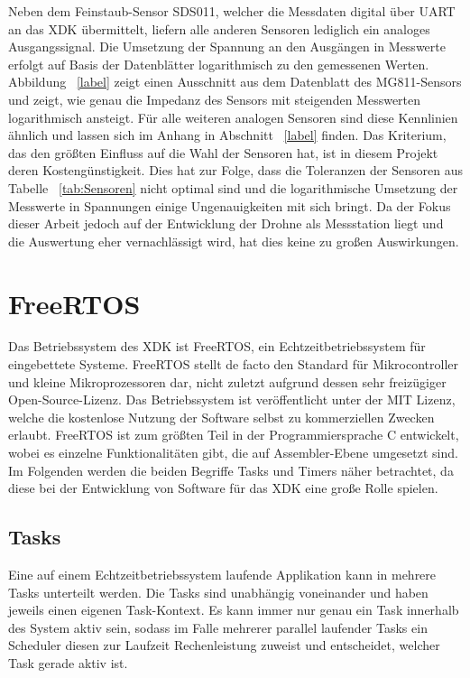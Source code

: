 Neben dem Feinstaub-Sensor SDS011, welcher die Messdaten digital über \acs{UART} an das \acs{XDK} übermittelt, liefern alle anderen Sensoren lediglich ein analoges Ausgangssignal. Die Umsetzung der Spannung an den Ausgängen in Messwerte erfolgt auf Basis der Datenblätter logarithmisch zu den gemessenen Werten. \newline
Abbildung ~\ref{label} zeigt einen Ausschnitt aus dem Datenblatt des MG811-Sensors und zeigt, wie genau die Impedanz des Sensors mit steigenden Messwerten logarithmisch ansteigt. Für alle weiteren analogen Sensoren sind diese Kennlinien ähnlich und lassen sich im Anhang in Abschnitt ~\ref{label} finden.
\newline \newline 
Das Kriterium, das den größten Einfluss auf die Wahl der Sensoren hat, ist in diesem Projekt deren Kostengünstigkeit.
\newline
Dies hat zur Folge, dass die Toleranzen der Sensoren aus Tabelle ~\ref{tab:Sensoren} nicht optimal sind und die logarithmische Umsetzung der Messwerte in Spannungen einige Ungenauigkeiten mit sich bringt. \newline
Da der Fokus dieser Arbeit jedoch auf der Entwicklung der Drohne als Messstation liegt und die Auswertung eher vernachlässigt wird, hat dies keine zu großen Auswirkungen.
\section{FreeRTOS}\label{sec:FreeRTOS}
Das Betriebssystem des \acs*{XDK} ist FreeRTOS, ein Echtzeitbetriebssystem für eingebettete Systeme. FreeRTOS stellt de facto den Standard für Mikrocontroller und kleine Mikroprozessoren dar, nicht zuletzt aufgrund dessen sehr freizügiger Open-Source-Lizenz. Das Betriebssystem ist veröffentlicht unter der MIT Lizenz, welche die kostenlose Nutzung der Software selbst zu kommerziellen Zwecken erlaubt. FreeRTOS ist zum größten Teil in der Programmiersprache C entwickelt, wobei es einzelne Funktionalitäten gibt, die auf Assembler-Ebene umgesetzt sind. Im Folgenden werden die beiden Begriffe Tasks und Timers näher betrachtet, da diese bei der Entwicklung von Software für das \acs*{XDK} eine große Rolle spielen.
\subsection{Tasks}\label{subsec:Tasks}
Eine auf einem Echtzeitbetriebssystem laufende Applikation kann in mehrere Tasks unterteilt werden. Die Tasks sind unabhängig voneinander und haben jeweils einen eigenen Task-Kontext. Es kann immer nur genau ein Task innerhalb des System aktiv sein, sodass im Falle mehrerer parallel laufender Tasks ein Scheduler diesen zur Laufzeit Rechenleistung zuweist und entscheidet, welcher Task gerade aktiv ist. 
